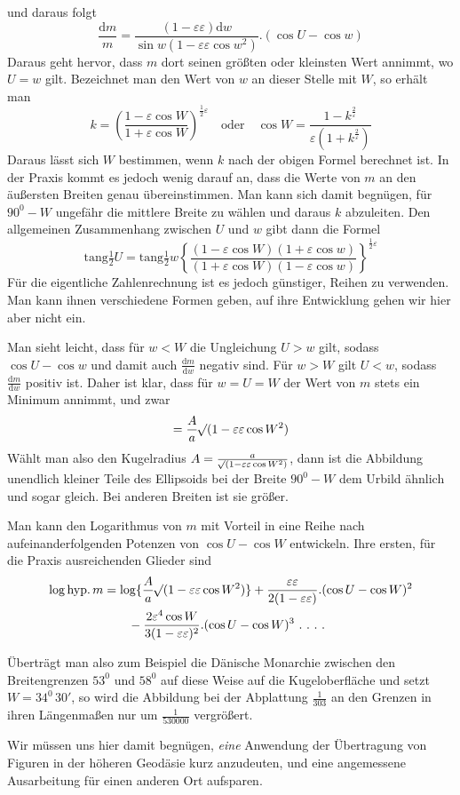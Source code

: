 \noindent und daraus folgt
\[
\frac{\mathrm{d}m}{m}=\frac{(1-\varepsilon\varepsilon)\mathrm{d}w}{\sin w(1-\varepsilon\varepsilon\cos w^2)}\mathord{.}(\cos U-\cos w)
\]
\noindent Daraus geht hervor, dass \(m\) dort seinen größten oder kleinsten Wert annimmt, wo \(U=w\) gilt. Bezeichnet man den Wert von \(w\) an dieser Stelle mit \(W\), so erhält man
\[
k=(\frac{1-\varepsilon\cos W}{1+\varepsilon\cos W})^{\frac{1}{2}\varepsilon}\quad\text{oder}\quad \cos W=\frac{1-k^{\frac{2}{\varepsilon}}}{\varepsilon(1+k^{\frac{2}{\varepsilon}})}
\]
\noindent Daraus lässt sich \(W\) bestimmen, wenn \(k\) nach der obigen Formel berechnet ist. In der Praxis kommt es jedoch wenig darauf an, dass die Werte von \(m\) an den äußersten Breiten genau übereinstimmen. Man kann sich damit begnügen, für \(90^0-W\) ungefähr die mittlere Breite zu wählen und daraus \(k\) abzuleiten. Den allgemeinen Zusammenhang zwischen \(U\) und \(w\) gibt dann die Formel
\[
\mathrm{tang}\tfrac{1}{2}U=\mathrm{tang}\tfrac{1}{2}w\left\{\frac{(1-\varepsilon\cos W)(1+\varepsilon\cos w)}{(1+\varepsilon\cos W)(1-\varepsilon\cos w)}\right\}^{\frac{1}{2}\varepsilon}
\]
\noindent Für die eigentliche Zahlenrechnung ist es jedoch günstiger, Reihen zu verwenden. Man kann ihnen verschiedene Formen geben, auf ihre Entwicklung gehen wir hier aber nicht ein.

Man sieht leicht, dass für \(w<W\) die Ungleichung \(U>w\) gilt, sodass \(\cos U-\cos w\) und damit auch \(\frac{\mathrm{d}m}{\mathrm{d}w}\) negativ sind. Für \(w>W\) gilt \(U<w\), sodass \(\frac{\mathrm{d}m}{\mathrm{d}w}\) positiv ist. Daher ist klar, dass für \(w=U=W\) der Wert von \(m\) stets ein Minimum annimmt, und zwar
\[
=\frac{A}{a}\mathord{{}^{}\!\surd}(1-\varepsilon\varepsilon\cos W^2)
\]
\noindent Wählt man also den Kugelradius \(A=\frac{a}{\mathord{{}^{}\!\surd}(1-\varepsilon\varepsilon\cos W^2)}\), dann ist die Abbildung unendlich kleiner Teile des Ellipsoids bei der Breite \(90^0-W\) dem Urbild ähnlich und sogar gleich. Bei anderen Breiten ist sie größer.

Man kann den Logarithmus von \(m\) mit Vorteil in eine Reihe nach aufeinanderfolgenden Potenzen von \(\cos U-\cos W\) entwickeln. Ihre ersten, für die Praxis ausreichenden Glieder sind
%
\[
\begin{aligned}
\log\mathrm{hyp}.\,m&=\log\{\frac{A}{a}\BareRoot{(1-\varepsilon\varepsilon\cos W^2)}\}+\frac{\varepsilon\varepsilon}{2(1-\varepsilon\varepsilon)}\mathord{.}(\cos U-\cos W)^2\\
&\qquad-\frac{2\varepsilon^4\cos W}{3(1-\varepsilon\varepsilon)^2}\mathord{.}(\cos U-\cos W)^3\ .\ .\ .\ .
\end{aligned}
\]
\par\indent Überträgt man also zum Beispiel die Dänische Monarchie zwischen den Breitengrenzen \(53^0\) und \(58^0\) auf diese Weise auf die Kugeloberfläche und setzt \(W=34^0\,30'\), so wird die Abbildung bei der Abplattung \(\frac{1}{303}\) an den Grenzen in ihren Längenmaßen nur um \(\frac{1}{530000}\) vergrößert.

Wir müssen uns hier damit begnügen, \textit{eine} Anwendung der Übertragung von Figuren in der höheren Geodäsie kurz anzudeuten, und eine angemessene Ausarbeitung für einen anderen Ort aufsparen.

